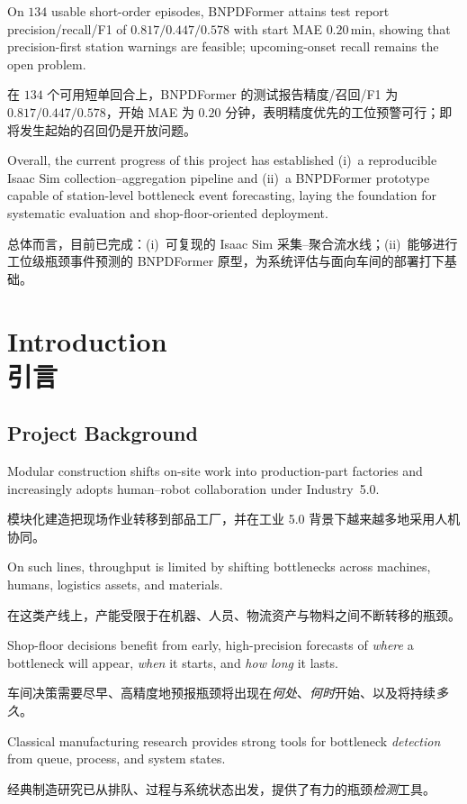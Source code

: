 \documentclass[12pt,a4paper,oneside,scheme=plain]{ctexrep}
\newcommand{\bip}[2]{%
  \par #1\par
  \nobreak\vspace{0.12em}%
  {\small\color{black!62}#2}\par
  \vspace{0.62em}%
}
\begin{document}
\bip
{On $134$ usable short-order episodes, BNPDFormer attains test report precision/recall/F1 of $0.817/0.447/0.578$ with start MAE $0.20$\,min, showing that precision-first station warnings are feasible; upcoming-onset recall remains the open problem.}
{在 $134$ 个可用短单回合上，BNPDFormer 的测试报告精度/召回/F1 为 $0.817/0.447/0.578$，开始 MAE 为 $0.20$ 分钟，表明精度优先的工位预警可行；即将发生起始的召回仍是开放问题。}

\bip
{Overall, the current progress of this project has established (i)~a reproducible Isaac Sim collection--aggregation pipeline and (ii)~a BNPDFormer prototype capable of station-level bottleneck event forecasting, laying the foundation for systematic evaluation and shop-floor-oriented deployment.}
{总体而言，目前已完成：(i)~可复现的 Isaac Sim 采集--聚合流水线；(ii)~能够进行工位级瓶颈事件预测的 BNPDFormer 原型，为系统评估与面向车间的部署打下基础。}

\clearpage

\chapter[Introduction / 引言]{Introduction\\[0.3em]{\large 引言}}
\label{ch:intro}

\section[Project Background / 项目背景]{Project Background}
\label{sec:background}

\bip
{Modular construction shifts on-site work into production-part factories and increasingly adopts human--robot collaboration under Industry~5.0.}
{模块化建造把现场作业转移到部品工厂，并在工业 5.0 背景下越来越多地采用人机协同。}

\bip
{On such lines, throughput is limited by shifting bottlenecks across machines, humans, logistics assets, and materials.}
{在这类产线上，产能受限于在机器、人员、物流资产与物料之间不断转移的瓶颈。}

\bip
{Shop-floor decisions benefit from early, high-precision forecasts of \emph{where} a bottleneck will appear, \emph{when} it starts, and \emph{how long} it lasts.}
{车间决策需要尽早、高精度地预报瓶颈将出现在\emph{何处}、\emph{何时}开始、以及将持续\emph{多久}。}

\bip
{Classical manufacturing research provides strong tools for bottleneck \emph{detection} from queue, process, and system states.}
{经典制造研究已从排队、过程与系统状态出发，提供了有力的瓶颈\emph{检测}工具。}
\end{document}
